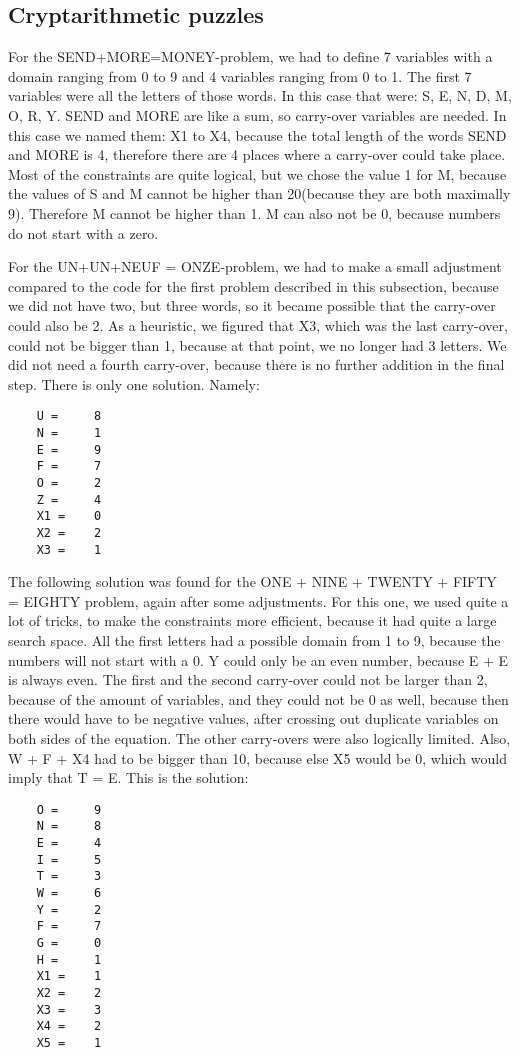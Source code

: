 \documentclass{article}
\begin{document}
	\subsection*{Cryptarithmetic puzzles}
	
	For the SEND+MORE=MONEY-problem, we had to define 7 variables with a domain ranging from 0 to 9 and 4 variables ranging from 0 to 1. The first 7 variables were all the letters of those words. In this case that were: S, E, N, D, M, O, R, Y. SEND and MORE are like a sum, so carry-over variables are needed. In this case we named them: X1 to X4, because the total length of the words SEND and MORE is 4, therefore there are 4 places where a carry-over could take place. 
Most of the constraints are quite logical, but we chose the value 1 for M, because the values of S and M cannot be higher than 20(because they are both maximally 9). Therefore M cannot be higher than 1. M can also not be 0, because numbers do not start with a zero.
	
	For the UN+UN+NEUF = ONZE-problem, we had to make a small adjustment compared to the code for the first problem described in this subsection, because we did not have two, but three words, so it became possible that the carry-over could also be 2. As a heuristic, we figured that X3, which was the last carry-over, could not be bigger than 1, because at that point, we no longer had 3 letters. We did not need a fourth carry-over, because there is no further addition in the final step. There is only one solution. Namely:
	\begin{lstlisting}
	U = 	8 
	N = 	1 
	E = 	9 
	F = 	7 
	O = 	2 
	Z = 	4 
	X1 = 	0 
	X2 = 	2 
	X3 = 	1 
	\end{lstlisting}
	
	The following solution was found for the ONE + NINE + TWENTY + FIFTY = EIGHTY problem, again after some adjustments. For this one, we used quite a lot of tricks, to make the constraints more efficient, because it had quite a large search space. All the first letters had a possible domain from 1 to 9, because the numbers will not start with a 0. Y could only be an even number, because E + E is always even. The first and the second carry-over could not be larger than 2, because of the amount of variables, and they could not be 0 as well, because then there would have to be negative values, after crossing out duplicate variables on both sides of the equation. The other carry-overs were also logically limited. Also, W + F + X4 had to be bigger than 10, because else X5 would be 0, which would imply that T = E. This is the solution:
	\begin{lstlisting}
	O = 	9 
	N = 	8 
	E = 	4 
	I = 	5 
	T = 	3 
	W = 	6 
	Y = 	2 
	F = 	7 
	G = 	0 
	H = 	1 
	X1 = 	1 
	X2 = 	2 
	X3 = 	3 
	X4 = 	2 
	X5 = 	1 
	\end{lstlisting}
	
\end{document}
